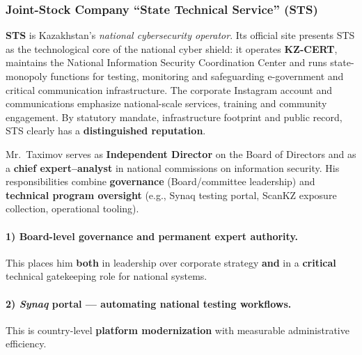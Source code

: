 \subsubsection{Joint-Stock Company “State Technical Service” (STS)}
\label{subsubsec:RoleSTS}

\textbf{STS} is Kazakhstan’s \emph{national cybersecurity operator}. Its official site presents STS as the technological core of the national cyber shield: it operates \textbf{KZ-CERT}, maintains the National Information Security Coordination Center and runs state-monopoly functions for testing, monitoring and safeguarding e-government and critical communication infrastructure.   
The corporate Instagram account and communications emphasize national-scale services, training and community engagement.   
By statutory mandate, infrastructure footprint and public record, STS clearly has a \textbf{distinguished reputation}.

Mr.\ Taximov serves as \textbf{Independent Director} on the Board of Directors and as a \textbf{chief expert–analyst} in national commissions on information security. His responsibilities combine \textbf{governance} (Board/committee leadership) and \textbf{technical program oversight} (e.g., Synaq testing portal, ScanKZ exposure collection, operational tooling). 

\paragraph{1) Board-level governance and permanent expert authority.}
This places him \textbf{both} in leadership over corporate strategy \textbf{and} in a \textbf{critical} technical gatekeeping role for national systems.

\paragraph{2) \emph{Synaq} portal — automating national testing workflows.}
This is country-level \textbf{platform modernization} with measurable administrative efficiency.

